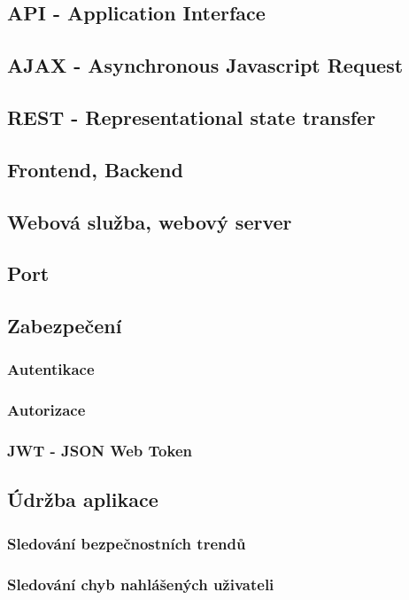 \documentclass[14pt,a4paper]{article}
\begin{document}
        \subsection{API - Application Interface}
        \subsection{AJAX - Asynchronous Javascript Request}
        \subsection{REST - Representational state transfer}
        \subsection{Frontend, Backend}
        \subsection{Webová služba, webový server}
        \subsection{Port}
        \subsection{Zabezpečení}
            \subsubsection{Autentikace}
            \subsubsection{Autorizace}
            \subsubsection{JWT - JSON Web Token}
        \subsection{Údržba aplikace}
            \subsubsection{Sledování bezpečnostních trendů}
            \subsubsection{Sledování chyb nahlášených uživateli}
\end{document}
